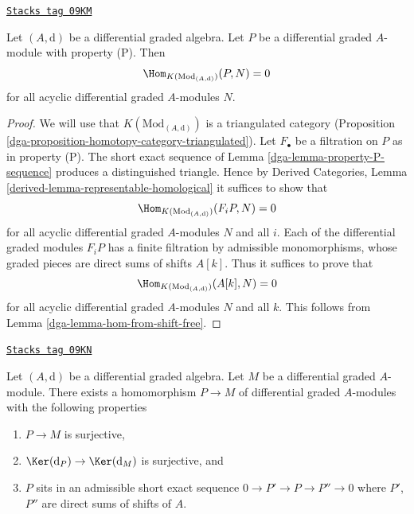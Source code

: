 \begin{lemma}
\label{dga-lemma-property-P-K-projective}
\href{https://stacks.math.columbia.edu/tag/09KM}{\texttt{Stacks tag 09KM}}

Let $(A, \text{d})$ be a differential graded algebra.
Let $P$ be a differential graded $A$-module with property (P).
Then
$$
\Hom_{K(\text{Mod}_{(A, \text{d})})}(P, N) = 0
$$
for all acyclic differential graded $A$-modules $N$.
\end{lemma}

\begin{proof}

We will use that $K(\text{Mod}_{(A, \text{d})})$ is a triangulated
category (Proposition \ref{dga-proposition-homotopy-category-triangulated}).
Let $F_\bullet$ be a filtration on $P$ as in property (P).
The short exact sequence of Lemma \ref{dga-lemma-property-P-sequence}
produces a distinguished triangle. Hence by
Derived Categories, Lemma \ref{derived-lemma-representable-homological}
it suffices to show that
$$
\Hom_{K(\text{Mod}_{(A, \text{d})})}(F_iP, N) = 0
$$
for all acyclic differential graded $A$-modules $N$ and all $i$.
Each of the differential graded modules $F_iP$ has a finite filtration
by admissible monomorphisms, whose graded pieces are direct sums
of shifts $A[k]$. Thus it suffices to prove that
$$
\Hom_{K(\text{Mod}_{(A, \text{d})})}(A[k], N) = 0
$$
for all acyclic differential graded $A$-modules $N$ and all $k$.
This follows from Lemma \ref{dga-lemma-hom-from-shift-free}.
\end{proof}

\begin{lemma}
\label{dga-lemma-good-quotient}
\href{https://stacks.math.columbia.edu/tag/09KN}{\texttt{Stacks tag 09KN}}

Let $(A, \text{d})$ be a differential graded algebra.
Let $M$ be a differential graded $A$-module. There exists a homomorphism
$P \to M$ of differential graded $A$-modules with the following
properties
\begin{enumerate}
\item $P \to M$ is surjective,
\item $\Ker(\text{d}_P) \to \Ker(\text{d}_M)$ is surjective, and
\item $P$ sits in an admissible short exact sequence
$0 \to P' \to P \to P'' \to 0$ where $P'$, $P''$ are direct sums
of shifts of $A$.
\end{enumerate}
\end{lemma}

